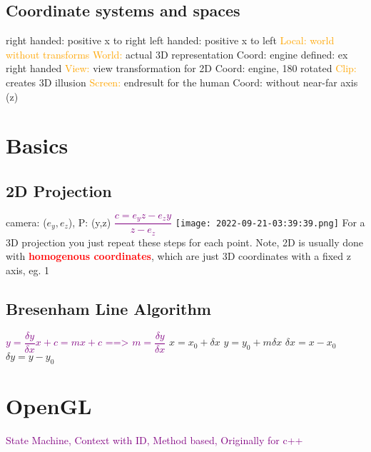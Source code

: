 \documentclass[main.tex,fontsize=12pt,paper=a4,paper=landscape,DIV=calc,]{scrartcl}
\begin{document}
\begin{multicols*}{4}
\subsection{Coordinate systems and spaces}
right handed: positive x to right\newline
left handed: positive x to left\newline
\textcolor{orange}{Local: world without transforms}\newline
\textcolor{orange}{World:} actual 3D representation \newline
Coord: engine defined: ex right handed\newline 
\textcolor{orange}{View:} view transformation for 2D \newline
Coord: engine, 180 rotated\newline
\textcolor{orange}{Clip:} creates 3D illusion\newline
\textcolor{orange}{Screen:} endresult for the human\newline
Coord: without near-far axis (z)

\section{Basics}
\subsection{2D Projection}
camera: (\(e_y, e_z\)), P: (y,z)\newline
\textcolor{purple}{\(\dfrac{c = e_y z - e_z y}{z - e_z}\)}
\texttt{[image: 2022-09-21-03:39:39.png]}\newline
For a 3D projection you just repeat these steps for each point.\newline
Note, 2D is usually done with \textcolor{red}{\textbf{homogenous coordinates}}, which are just 3D coordinates with a fixed z axis, eg. 1

\subsection{Bresenham Line Algorithm}
\textcolor{purple}{\(y = \dfrac{\delta y}{\delta x}x + c = mx + c\) ==> \(m = \dfrac{\delta y}{\delta x}\)}\newline
\(x = x_0 + \delta x\) \(y = y_0 + m\delta x\) \newline \(\delta x = x - x_0\) \(\delta y = y - y_0 \)

\section{OpenGL}
 \textcolor{purple}{State Machine, Context with ID, \newline Method based, Originally for c++}


\end{multicols*}
\end{document}
